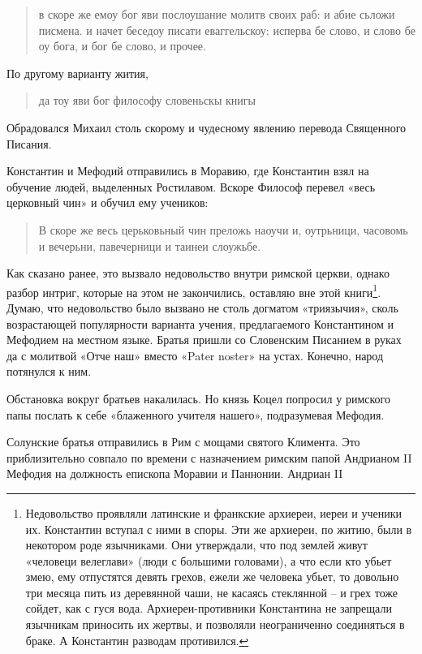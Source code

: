 \begin{quotation}
в скоре же емоу бог яви послоушание молитв своих раб: и абие сьложи писмена. и начет беседоу писати еваггельскоу: исперва бе слово, и слово бе оу бога, и бог бе слово, и прочее.
\end{quotation}

По другому варианту жития,

\begin{quotation}
да тоу яви бог философу словеньскы книгы
\end{quotation}

Обрадовался Михаил столь скорому и чудесному явлению перевода Священного Писания.

Константин и Мефодий отправились в Моравию, где Константин взял на обучение людей, выделенных Ростилавом. Вскоре Философ перевел «весь церковный чин» и обучил ему учеников:

\begin{quotation}
В скоре же весь церьковьный чин преложь наоучи и, оутрьници, часовомь и вечерьни, павечерници и таинеи слоужьбе.
\end{quotation}

Как сказано ранее, это вызвало недовольство внутри римской церкви, однако разбор интриг, которые на этом не закончились, оставляю вне этой книги\footnote{Недовольство проявляли латинские и франкские архиереи, иереи и ученики их. Константин вступал с ними в споры. Эти же архиереи, по житию, были в некотором роде язычниками. Они утверждали, что под землей живут «человеци велеглави» (люди с большими головами), а что если кто убьет змею, ему отпустятся девять грехов, ежели же человека убьет, то довольно три месяца пить из деревянной чаши, не касаясь стеклянной – и грех тоже сойдет, как с гуся вода. Архиереи-противники Константина не запрещали язычникам приносить их жертвы, и позволяли неограниченно соединяться в браке. А Константин разводам противился.}. Думаю, что недовольство было вызвано не столь догматом «триязычия», сколь возрастающей популярности варианта учения, предлагаемого Константином и Мефодием на местном языке. Братья пришли со Словенским Писанием в руках да с молитвой «Отче наш» вместо «Pater noster» на устах. Конечно, народ потянулся к ним.

Обстановка вокруг братьев накалилась. Но князь Коцел попросил у римского папы послать к себе «блаженного учителя нашего», подразумевая Мефодия.

Солунские братья отправились в Рим с мощами святого Климента. Это приблизительно совпало по времени с назначением римским папой Андрианом II Мефодия на должность епископа Моравии и Паннонии. Андриан II

